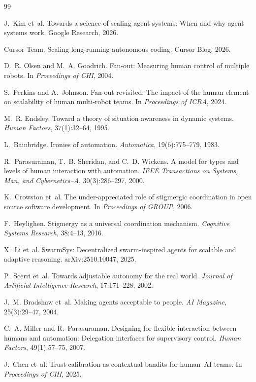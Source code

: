 \documentclass[11pt]{article}
\begin{document}
\begin{thebibliography}{99}

J.~Kim et~al.
\newblock Towards a science of scaling agent systems: When and why agent systems work.
\newblock Google Research, 2026.

Cursor Team.
\newblock Scaling long-running autonomous coding.
\newblock Cursor Blog, 2026.

D.~R. Olsen and M.~A. Goodrich.
\newblock Fan-out: Measuring human control of multiple robots.
\newblock In \emph{Proceedings of CHI}, 2004.

S.~Perkins and A.~Johnson.
\newblock Fan-out revisited: The impact of the human element on scalability of human multi-robot teams.
\newblock In \emph{Proceedings of ICRA}, 2024.

M.~R. Endsley.
\newblock Toward a theory of situation awareness in dynamic systems.
\newblock \emph{Human Factors}, 37(1):32--64, 1995.

L.~Bainbridge.
\newblock Ironies of automation.
\newblock \emph{Automatica}, 19(6):775--779, 1983.

R.~Parasuraman, T.~B. Sheridan, and C.~D. Wickens.
\newblock A model for types and levels of human interaction with automation.
\newblock \emph{IEEE Transactions on Systems, Man, and Cybernetics--A}, 30(3):286--297, 2000.

K.~Crowston et~al.
\newblock The under-appreciated role of stigmergic coordination in open source software development.
\newblock In \emph{Proceedings of GROUP}, 2006.

F.~Heylighen.
\newblock Stigmergy as a universal coordination mechanism.
\newblock \emph{Cognitive Systems Research}, 38:4--13, 2016.

X.~Li et~al.
\newblock SwarmSys: Decentralized swarm-inspired agents for scalable and adaptive reasoning.
\newblock arXiv:2510.10047, 2025.

P.~Scerri et~al.
\newblock Towards adjustable autonomy for the real world.
\newblock \emph{Journal of Artificial Intelligence Research}, 17:171--228, 2002.

J.~M. Bradshaw et~al.
\newblock Making agents acceptable to people.
\newblock \emph{AI Magazine}, 25(3):29--47, 2004.

C.~A. Miller and R.~Parasuraman.
\newblock Designing for flexible interaction between humans and automation: Delegation interfaces for supervisory control.
\newblock \emph{Human Factors}, 49(1):57--75, 2007.

J.~Chen et~al.
\newblock Trust calibration as contextual bandits for human--AI teams.
\newblock In \emph{Proceedings of CHI}, 2025.

\end{thebibliography}
\end{document}
